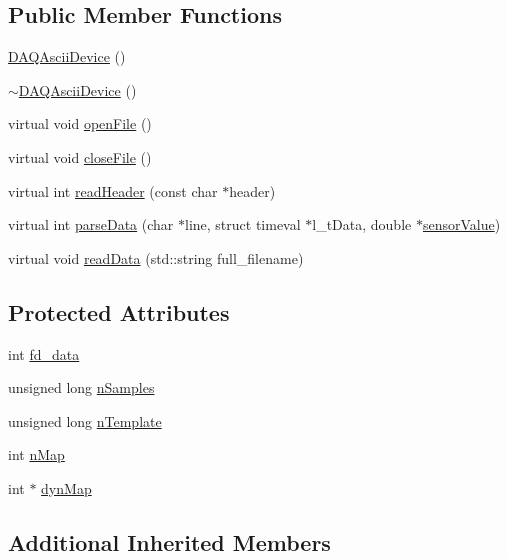 \subsection*{Public Member Functions}
\begin{DoxyCompactItemize}
\item 
\hyperlink{classDAQAsciiDevice_adaef2eca0f5c36b4e8aeebc72e87707c}{D\-A\-Q\-Ascii\-Device} ()
\item 
\hyperlink{classDAQAsciiDevice_a1fb0f1abaeb456ec194f64718c68128d}{$\sim$\-D\-A\-Q\-Ascii\-Device} ()
\item 
virtual void \hyperlink{classDAQAsciiDevice_ae79f6ea28b8f477b5eda360a0a5e5854}{open\-File} ()
\item 
virtual void \hyperlink{classDAQAsciiDevice_aef686b204dd3569291c5cc4534f7aa24}{close\-File} ()
\item 
virtual int \hyperlink{classDAQAsciiDevice_a5fce725c52b70ef2f56a34b32a03e15d}{read\-Header} (const char $\ast$header)
\item 
virtual int \hyperlink{classDAQAsciiDevice_a9c20d9d69af4ba1641dbc82dd5be2aa5}{parse\-Data} (char $\ast$line, struct timeval $\ast$l\-\_\-t\-Data, double $\ast$\hyperlink{classDAQDevice_ad148188c57598fdf4fd4c1c333aeb0d8}{sensor\-Value})
\item 
virtual void \hyperlink{classDAQAsciiDevice_a0d9b17803680d966c7025ca6f174cef0}{read\-Data} (std\-::string full\-\_\-filename)
\end{DoxyCompactItemize}
\subsection*{Protected Attributes}
\begin{DoxyCompactItemize}
\item 
int \hyperlink{classDAQAsciiDevice_aa683d088c84eeea43836ad7dbe804800}{fd\-\_\-data}
\item 
unsigned long \hyperlink{classDAQAsciiDevice_ad7c5b15ad8e21ca0ecbf52afec874543}{n\-Samples}
\item 
unsigned long \hyperlink{classDAQAsciiDevice_a7885676e316cf2533707297f30f96644}{n\-Template}
\item 
int \hyperlink{classDAQAsciiDevice_a2dd49b3ae40e05dfd2e761f350d4320b}{n\-Map}
\item 
int $\ast$ \hyperlink{classDAQAsciiDevice_a50307e0ce456fb3fe201f4acd0716058}{dyn\-Map}
\end{DoxyCompactItemize}
\subsection*{Additional Inherited Members}



